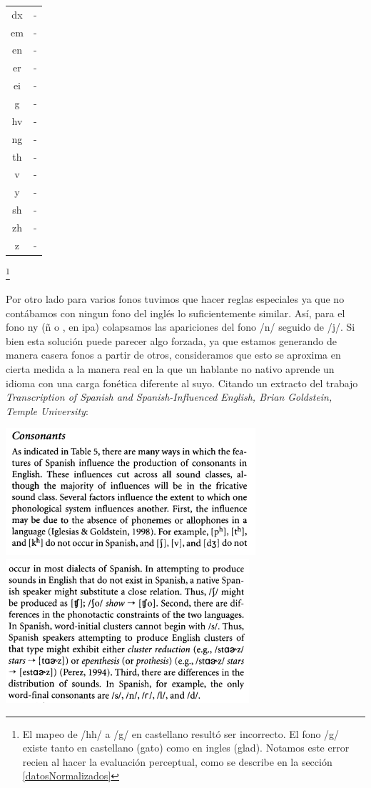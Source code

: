 \begin{table}
\begin{minipage}[t]{0.3\textwidth}
\begin{tabular}[t]{c|c}
dx & -\\  
em & -\\  
en & -\\  
er & -\\  
ei & -\\  
g & -\\ 
hv & -\\  
ng & -\\  
th & -\\  
v & -\\  
y & -\\  
sh & -\\  
zh & -\\  
z  & -\\  
\bottomrule
\end{tabular}
\end{minipage}
\end{table}

\footnote{El mapeo de /hh/ a /g/ en castellano resultó ser incorrecto. El fono /g/ existe tanto en castellano (gato) como en ingles (glad). Notamos este error recien al hacer la evaluación perceptual, como se describe en la sección \ref{datosNormalizados}}

Por otro lado para varios fonos tuvimos que hacer reglas especiales ya que no contábamos con ningun fono del inglés lo suficientemente similar. Así,  para el fono ny (ñ o \textltailn, en ipa) colapsamos las apariciones del fono /n/ seguido de /j/. Si bien esta solución puede parecer algo forzada, ya que estamos generando de manera casera fonos a partir de otros, consideramos que esto se aproxima en cierta medida a la manera real en la que un hablante no nativo aprende un idioma con una carga fonética diferente al suyo. Citando un extracto del trabajo \textit{Transcription of Spanish and Spanish-Influenced English, Brian Goldstein, Temple University}\cite{spanishInfluencedEnglish}:

\begin{center}
\includegraphics[scale=0.6]{imagenes_investigacion/consonantes1.png}
\includegraphics[scale=0.6]{imagenes_investigacion/consonantes2.png}
\end{center}

